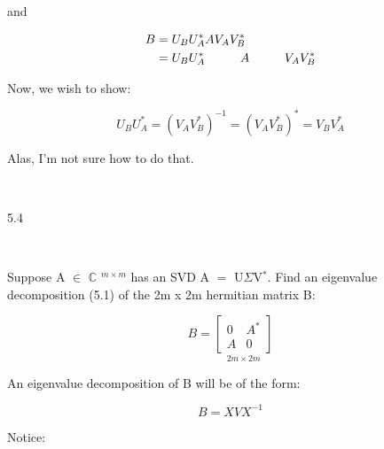 \documentclass[12pt]{article}
\newcommand{\mt}[1]{\ensuremath{#1}}
\newcommand{\bc}{\mt{\mathbb{C}} }       %
\newcommand{\mem}{\mt{\in} }
\newcommand{\eql}{\mt{=} }
\newcommand{\uf}[2]{#1\mt{^{#2}}}
\newcommand{\splt}[1]{\begin{split}#1\end{split}}
\newcommand\tab[1][1cm]{\hspace*{#1}}
\begin{document}
and

\begin{displaymath}
\splt{
B & = U_B U^*_A A V_A V^*_B \\
 & = U_B U^*_A \tab A \tab V_A V^*_B
}
\end{displaymath}

Now, we wish to show:

\begin{displaymath}
  U_B U^*_A = (V_A V^*_B)^{-1} = (V_A V^*_B)^* = V_B V_A^*
\end{displaymath}

Alas, I'm not sure how to do that.

\

5.4

\

Suppose A \mem \uf{\bc}{m \times m} has an SVD A \eql U$\Sigma$\uf{V}{*}. Find an eigenvalue decomposition (5.1) of the 2m x 2m hermitian matrix B:

\begin{displaymath}
  B = \underset{2m \times 2m}{
\begin{bmatrix}
   0 & A^* \\
   A & 0 
  \end{bmatrix}
}
\end{displaymath}

An eigenvalue decomposition of B will be of the form:

\begin{displaymath}
  B = XVX^{-1}
\end{displaymath}

Notice:
\end{document}
